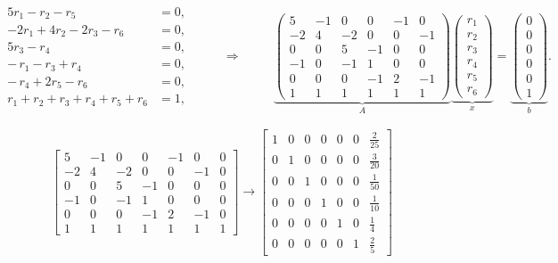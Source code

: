 \[
	\begin{array}{rcl}
		\begin{aligned}
			5r_1 - r_2 - r_5          & = 0, \\
			-2r_1 + 4r_2 - 2r_3 - r_6 & = 0, \\
			5r_3 - r_4                & = 0, \\
			-\,r_1 - r_3 + r_4        & = 0, \\
			-\,r_4 + 2r_5 - r_6       & = 0, \\
			r_1+r_2+r_3+r_4+r_5+r_6   & =1,
		\end{aligned}
		 & \qquad \Rightarrow \qquad &
		\underbrace{\!
			\begin{pmatrix}
				5  & -1 & 0  & 0  & -1 & 0  \\
				-2 & 4  & -2 & 0  & 0  & -1 \\
				0  & 0  & 5  & -1 & 0  & 0  \\
				-1 & 0  & -1 & 1  & 0  & 0  \\
				0  & 0  & 0  & -1 & 2  & -1 \\
				1  & 1  & 1  & 1  & 1  & 1
			\end{pmatrix}}_{\displaystyle A}
		\underbrace{\!
			\begin{pmatrix}r_1\\r_2\\r_3\\r_4\\r_5\\r_6\end{pmatrix}}_{\displaystyle x}
		=
		\underbrace{\!
			\begin{pmatrix}0\\0\\0\\0\\0\\1\end{pmatrix}}_{\displaystyle b}.
	\end{array}
\]

\[
	\left[
		\begin{array}{rrrrrr|r}
			5  & -1 & 0  & 0  & -1 & 0  & 0 \\
			-2 & 4  & -2 & 0  & 0  & -1 & 0 \\
			0  & 0  & 5  & -1 & 0  & 0  & 0 \\
			-1 & 0  & -1 & 1  & 0  & 0  & 0 \\
			0  & 0  & 0  & -1 & 2  & -1 & 0 \\
			1  & 1  & 1  & 1  & 1  & 1  & 1
		\end{array}
		\right]
	\overset{}{\longrightarrow}
	\left[
		\begin{array}{rrrrrr|r}
			1 & 0 & 0 & 0 & 0 & 0 & \tfrac{2}{25} \\
			0 & 1 & 0 & 0 & 0 & 0 & \tfrac{3}{20} \\
			0 & 0 & 1 & 0 & 0 & 0 & \tfrac{1}{50} \\
			0 & 0 & 0 & 1 & 0 & 0 & \tfrac{1}{10} \\
			0 & 0 & 0 & 0 & 1 & 0 & \tfrac{1}{4}  \\
			0 & 0 & 0 & 0 & 0 & 1 & \tfrac{2}{5}
		\end{array}
		\right]
\]

